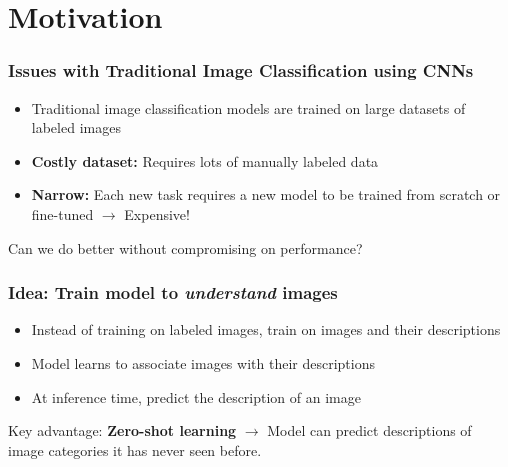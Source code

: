 \section{Motivation}
\begin{frame}
    \frametitle{Issues with Traditional Image Classification using CNNs}
    \begin{itemize}
        \item Traditional image classification models are trained on large datasets of labeled images
              \pause
        \item \textbf{Costly dataset:} Requires lots of manually labeled data
              \pause
        \item \textbf{Narrow:} Each new task requires a new model to be trained from scratch or fine-tuned $\rightarrow$ Expensive!
    \end{itemize}

    \pause

    Can we do better without compromising on performance?


\end{frame}

\begin{frame}
    \frametitle{Idea: Train model to \textit{understand} images}
    \begin{itemize}
        \item Instead of training on labeled images, train on images and their descriptions
        \item Model learns to associate images with their descriptions
        \item At inference time, predict the description of an image
    \end{itemize}

    \pause

    Key advantage: \textbf{Zero-shot learning} $\rightarrow$ Model can predict descriptions of image categories it has never seen before.
\end{frame}
